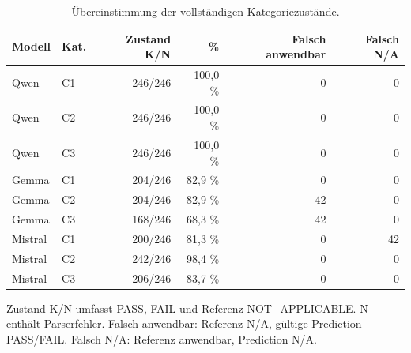 \begin{table}[htbp]
\centering\small
\caption{Übereinstimmung der vollständigen Kategoriezustände.}
\label{tab_v2_dimensions}
\begin{tabular}{llrrrr}
\toprule
Modell & Kat. & Zustand K/N & \% & Falsch anwendbar & Falsch N/A \\
\midrule
Qwen & C1 & 246/246 & 100,0 \% & 0 & 0 \\
Qwen & C2 & 246/246 & 100,0 \% & 0 & 0 \\
Qwen & C3 & 246/246 & 100,0 \% & 0 & 0 \\
Gemma & C1 & 204/246 & 82,9 \% & 0 & 0 \\
Gemma & C2 & 204/246 & 82,9 \% & 42 & 0 \\
Gemma & C3 & 168/246 & 68,3 \% & 42 & 0 \\
Mistral & C1 & 200/246 & 81,3 \% & 0 & 42 \\
Mistral & C2 & 242/246 & 98,4 \% & 0 & 0 \\
Mistral & C3 & 206/246 & 83,7 \% & 0 & 0 \\
\bottomrule
\end{tabular}
\par\smallskip\noindent
\begin{minipage}{\linewidth}\footnotesize Zustand K/N umfasst PASS, FAIL und Referenz-NOT\_APPLICABLE. N enthält Parserfehler. Falsch anwendbar: Referenz N/A, gültige Prediction PASS/FAIL. Falsch N/A: Referenz anwendbar, Prediction N/A.\end{minipage}
\end{table}
